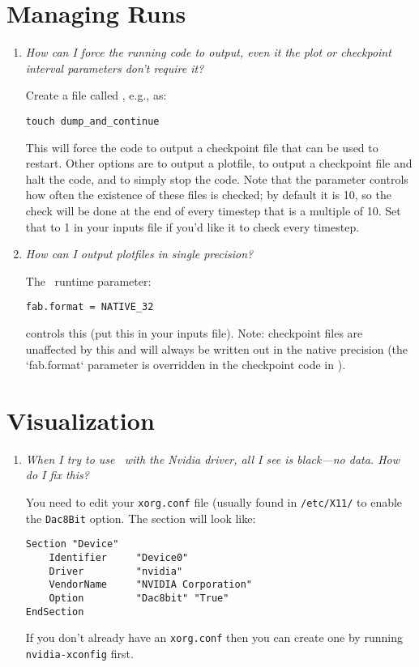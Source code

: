 \section{Managing Runs}

\begin{enumerate}

\item {\em How can I force the running code to output, even it the plot or
 checkpoint interval parameters don't require it?}

Create a file called , e.g., as:
\begin{verbatim}
touch dump_and_continue
\end{verbatim}

This will force the code to output a checkpoint file that can be used
to restart.  Other options are  to output
a plotfile,  to output a checkpoint file
and halt the code, and  to simply stop the code.
Note that the parameter  controls how often
the existence of these files is checked; by default it is 10, so the
check will be done at the end of every timestep that is a multiple of 10.
Set that to 1 in your inputs file if you'd like it to check every timestep.


\item {\em How can I output plotfiles in single precision?}

The \amrex\ runtime parameter:
\begin{verbatim}
fab.format = NATIVE_32
\end{verbatim}
controls this (put this in your inputs file).  Note: checkpoint files are unaffected 
by this and will always be written out in the native precision (the `fab.format` parameter
is overridden in the checkpoint code in \amrex).

\end{enumerate}

\section{Visualization}

\label{ch:faq:vis}

\begin{enumerate}

\item {\em When I try to use \amrvis\ with the Nvidia driver, all I see is
  black---no data.  How do I fix this?}

  You need to edit your {\tt xorg.conf} file (usually found in {\tt /etc/X11/}
to enable the {\tt Dac8Bit} option.  The section will look like:
\begin{verbatim}
Section "Device"
    Identifier     "Device0"
    Driver         "nvidia"
    VendorName     "NVIDIA Corporation"
    Option         "Dac8bit" "True"
EndSection
\end{verbatim}
If you don't already have an {\tt xorg.conf} then you can create one
by running {\tt nvidia-xconfig} first.


\end{enumerate}
